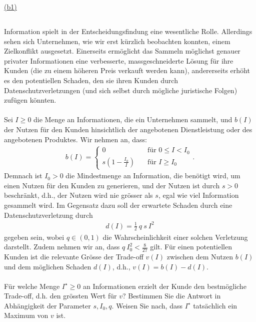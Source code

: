 \underline{(b1) }\\


\newpage
\subsection*{}
Information spielt in der Entscheidungsfindung eine wesentliche Rolle. Allerdings
sehen sich Unternehmen, wie wir erst kürzlich beobachten konnten, einem Zielkonflikt
ausgesetzt. Einerseits ermöglicht das Sammeln möglichst genauer privater Informationen eine verbesserte, massgeschneiderte Lösung für ihre Kunden (die zu einem höheren Preis verkauft werden kann), andererseits erhöht es den potentiellen Schaden, den sie ihren Kunden durch Datenschutzverletzungen (und sich selbst durch mögliche juristische Folgen) zufügen könnten.\\
\\
Sei $I \geq 0 $ die Menge an Informationen, die ein Unternehmen sammelt, und $b(I)$ der Nutzen für den Kunden hinsichtlich der angebotenen Dienstleistung oder des angebotenen Produktes. Wir nehmen an, dass:
\begin{align*}
	b(I)
	= 
	\begin{cases}
		0 &\quad \textrm{für } 0 \leq I  < I_0\\
		s \left( 1 - \frac{I_0}{I} \right) & \quad \textrm{für } I \geq I_0
	\end{cases}.
\end{align*}
Demnach ist $I_0 > 0 $ die Mindestmenge an Information, die benötigt wird, um einen Nutzen für den Kunden zu generieren, und der Nutzen ist durch $s > 0 $ beschränkt, d.h., der Nutzen wird nie grösser als $s$, egal wie viel Information gesammelt wird. Im Gegensatz dazu soll der erwartete Schaden durch eine Datenschutzverletzung durch
\begin{align*}
	d(I) = \frac{1}{2} \ q \ s  \ I^2
\end{align*}
gegeben sein, wobei $q \in (0,1)$ die Wahrscheinlichkeit einer solchen Verletzung darstellt.
Zudem nehmen wir an, dass $q \  I_0^2 < \frac{8}{27}$ gilt. Für einen potentiellen Kunden ist die relevante Grösse der Trade-off $v(I)$ zwischen dem Nutzen $b(I)$ und dem möglichen Schaden $d(I)$, d.h., $v(I) = b(I) - d(I)$.\\
\\
Für welche Menge $I^\star \geq 0$ an Informationen erzielt der Kunde den bestmögliche Trade-off, d.h. den grössten Wert für $v$?
Bestimmen Sie die Antwort in Abhängigkeit der Parameter $s, I_0, q$.
Weisen Sie nach, dass $I^\star$ tatsächlich ein Maximum von $v$ ist.\\
